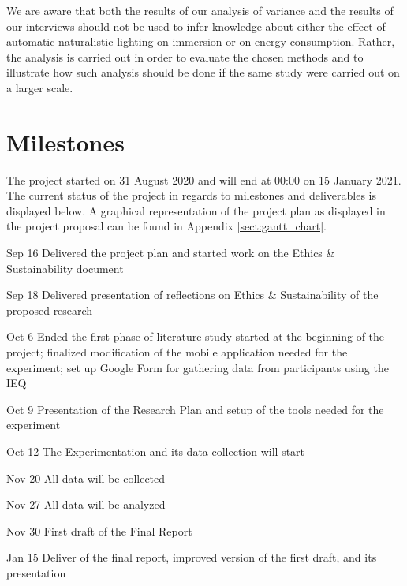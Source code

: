 \documentclass[12pt,twoside,english]{article}
\begin{document}
We are aware that both the results of our analysis of variance and the results of our interviews should not be used to infer knowledge about either the effect of automatic naturalistic lighting on immersion or on energy consumption.
Rather, the analysis is carried out in order to evaluate the chosen methods and to illustrate how such analysis should be done if the same study were carried out on a larger scale.

\section{Milestones}
\label{sect:milestones}

The project started on 31 August 2020 and will end at 00:00 on 15 January 2021.
The current status of the project in regards to milestones and deliverables is displayed below.
A graphical representation of the project plan as displayed in the project proposal can be found in Appendix \ref{sect:gantt_chart}.

\begin{description}
\item{Sep 16} Delivered the project plan and started work on the Ethics \& Sustainability document

\item {Sep 18} Delivered presentation of reflections on Ethics \& Sustainability of the proposed research

\item {Oct 6} Ended the first phase of literature study started at the beginning of the project; finalized modification of the mobile application needed for the experiment; set up Google Form for gathering data from participants using the \gls{IEQ}

\item {Oct 9} Presentation of the Research Plan and setup of the tools needed for the experiment

\item {Oct 12} The Experimentation and its data collection will start

\item {Nov 20} All data will be collected

\item {Nov 27} All data will be analyzed

\item {Nov 30} First draft of the Final Report

\item {Jan 15} Deliver of the final report, improved version of the first draft, and its presentation

\end{description}
\end{document}
